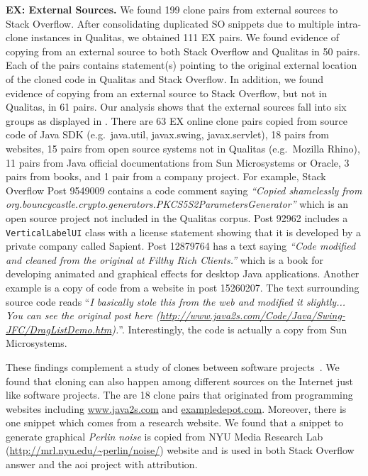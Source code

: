 \documentclass[10pt,journal,compsoc]{IEEEtran}
\begin{document}
\textbf{EX: External Sources.} We found 199 clone pairs from external sources to
Stack Overflow. After consolidating duplicated SO snippets due to multiple
intra-clone instances in Qualitas, we obtained 111 EX pairs. We found
evidence of copying from an external source to both Stack
Overflow and Qualitas in 50 pairs. Each of the pairs contains
statement(s) pointing to the original external location of the cloned
code in Qualitas and Stack Overflow. In addition, we found evidence
of copying from an external source to Stack Overflow, but not in
Qualitas, in 61 pairs. 
Our
analysis shows that the external sources fall into six groups as displayed in
. There are 63 EX online clone pairs copied
from source code of Java SDK (e.g.\ \textsf{java.util}, \textsf{javax.swing}, \textsf{javax.servlet}), 
18 pairs from websites, 15 pairs from open
source systems not in Qualitas (e.g.\ \textsf{Mozilla
	Rhino}), 11 pairs from Java official documentations from Sun
Microsystems or Oracle, 3 pairs from books, and 1 pair from a company
project. For example, Stack Overflow Post 9549009 contains a code comment saying
\textit{``Copied shamelessly from
	org.bouncycastle.crypto.generators.PKCS5S2ParametersGenerator''} which is an
open source project not included in the Qualitas corpus. Post 92962 includes a {\small\texttt{VerticalLabelUI}}
class with a license statement showing that it is developed by a private company
called \textsf{Sapient}. Post 12879764 has a text saying \textit{``Code modified
	and cleaned from the original at Filthy Rich Clients.''} which is a book for
developing animated and graphical effects for desktop Java applications. Another
example is a copy of code from a website in post 15260207. The text surrounding
source code reads ``\textit{I basically stole this from the web and modified it
	slightly... You can see the original post here
	(\url{http://www.java2s.com/Code/Java/Swing-JFC/DragListDemo.htm}).}''.
Interestingly, the code is actually a copy from Sun Microsystems.

These findings complement a study of clones between software
projects~\cite{Svajlenko2014}. We found that cloning can also happen among
different sources on the Internet just like software projects. The are 18 clone
pairs that originated from programming websites including \url{www.java2s.com}
and \url{exampledepot.com}. Moreover, there is one snippet which comes from a
research website. We found that a snippet to generate graphical \textit{Perlin
	noise} is copied from NYU Media Research Lab
(\url{http://mrl.nyu.edu/~perlin/noise/}) website and is used in both Stack Overflow
answer and the \textsf{aoi} project with attribution. 
\end{document}
